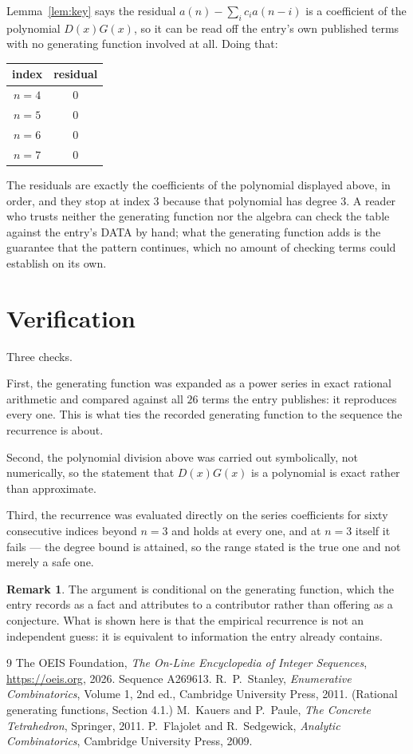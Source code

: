 \documentclass[11pt,a4paper]{article}
\theoremstyle{plain}
\theoremstyle{definition}
\newtheorem{remark}[theorem]{Remark}
\begin{document}
Lemma~\ref{lem:key} says the residual $a(n)-\sum_ic_ia(n-i)$ is a coefficient of the
polynomial $D(x)G(x)$, so it can be read off the entry's own published terms with no
generating function involved at all. Doing that:
\begin{center}
\begin{tabular}{cc}
index & residual \\ \hline
$n=4$ & $0$ \\
$n=5$ & $0$ \\
$n=6$ & $0$ \\
$n=7$ & $0$
\end{tabular}
\end{center}
The residuals are exactly the coefficients of the polynomial displayed above, in order, and
they stop at index $3$ because that polynomial has degree $3$. A reader who trusts
neither the generating function nor the algebra can check the table against the entry's DATA
by hand; what the generating function adds is the guarantee that the pattern continues, which
no amount of checking terms could establish on its own.

\section{Verification}

Three checks.

First, the generating function was expanded as a power series in exact rational arithmetic and
compared against all $26$ terms the entry publishes: it reproduces every one. This is
what ties the recorded generating function to the sequence the recurrence is about.

Second, the polynomial division above was carried out symbolically, not numerically, so the
statement that $D(x)G(x)$ is a polynomial is exact rather than approximate.

Third, the recurrence was evaluated directly on the series coefficients for sixty consecutive
indices beyond $n=3$ and holds at every one, and at $n=3$ itself it fails --- the
degree bound is attained, so the range stated is the true one and not merely a safe one.

\begin{remark}
The argument is conditional on the generating function, which the entry records as a fact and
attributes to a contributor rather than offering as a conjecture. What is shown here is that
the empirical recurrence is not an independent guess: it is equivalent to information the
entry already contains.
\end{remark}

\begin{thebibliography}{9}
 The OEIS Foundation, \emph{The On-Line Encyclopedia of Integer
Sequences}, \url{https://oeis.org}, 2026. Sequence A269613.
 R.~P.~Stanley, \emph{Enumerative Combinatorics}, Volume 1, 2nd ed.,
Cambridge University Press, 2011. (Rational generating functions, Section 4.1.)
 M.~Kauers and P.~Paule, \emph{The Concrete Tetrahedron}, Springer, 2011.
 P.~Flajolet and R.~Sedgewick, \emph{Analytic Combinatorics}, Cambridge
University Press, 2009.
\end{thebibliography}
\end{document}
